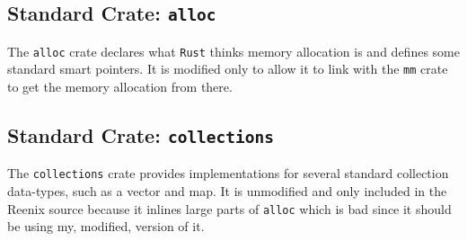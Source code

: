 \documentclass[12pt,letterpaper]{article}
\newcommand{\rust}{\texttt{Rust}}
\begin{document}
\subsection{Standard Crate: \texttt{alloc}}
The \texttt{alloc} crate declares what \rust{} thinks memory allocation
is and defines some standard smart pointers. It is modified only to
allow it to link with the \texttt{mm} crate to get the memory allocation
from there.

\subsection{Standard Crate: \texttt{collections}}
The \texttt{collections} crate provides implementations for several
standard collection data-types, such as a vector and map.  It is
unmodified and only included in the Reenix source because it inlines
large parts of \texttt{alloc} which is bad since it should be using
my, modified, version of it.
\end{document}
